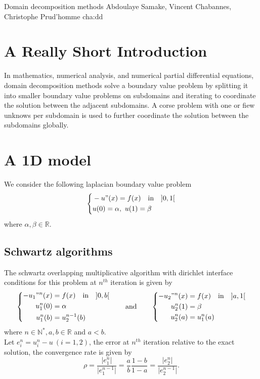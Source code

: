             {Domain decomposition methods}
            {Abdoulaye Samake, Vincent Chabannes, Christophe Prud'homme}
            {cha:dd}

\section{A Really Short Introduction}
\label{sec:really-short-intr}
In mathematics, numerical analysis, and numerical partial differential equations, domain decomposition methods solve
a boundary value problem by splitting it into smaller boundary value problems on subdomains and iterating to coordinate
the solution between the adjacent subdomains. A corse problem with one or fiew unknows per subdomain is used to further
coordinate the solution between the subdomains globally.
\section{A 1D model}
\label{sec:1d-mode}
We consider the following laplacian boundary value problem
\begin{equation}
  \left \{
    \begin{aligned}
      & -u"(x) = f(x) \quad \text{in} \quad  ]0,1[ \\
      & u(0) =\alpha, ~ u(1) = \beta
    \end{aligned}
  \right.
\label{eq:30}
\end{equation}
where $\alpha, \beta \in \mathbb R.$
\subsection{Schwartz algorithms}
\label{sec:schwartz-algorithms}
The schwartz overlapping multiplicative algorithm with dirichlet interface conditions for this problem at $n^{th}$ iteration is given by
\begin{equation}
  \label{eq:31}
  \left \{
    \begin{aligned}
      -u_1"^n(x) & =  f(x) \quad  \text{in}  \quad  ]0,b[  \\
       u_1^n(0) & =  \alpha \\
       u_1^n(b)  & = u_2^{n-1}(b)
    \end{aligned}
  \right.
\qquad \text{and} \qquad
  \left \{
    \begin{aligned}
      -u_2"^n(x) & =  f(x) \quad  \text{in}  \quad  ]a,1[  \\
      u_2^n(1) & =  \beta \\
      u_2^n(a)  & = u_1^n(a)
    \end{aligned}
  \right.
\end{equation}
where $ n \in \mathbb N^*, a, b \in \mathbb R $ and $a < b$. \\
Let $e_i^n = u_i^n-u~(i=1,2)$, the error at $n^{th}$ iteration relative to the exact solution, the convergence rate is given by
\begin{equation}
  \rho = \frac{\vert e_1^n  \vert}{\vert e_1^{n-1}  \vert} = \frac{a}{b}\frac{1-b}{1-a} = \frac{\vert e_2^n  \vert}{\vert e_2^{n-1}  \vert} .
  \label{eq:32}
\end{equation}

